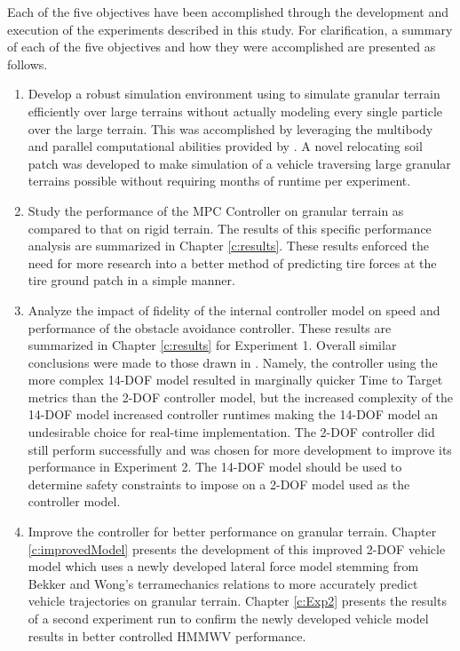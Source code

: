 \documentclass[12pt,onecolumn]{report}
\newcommand{\CHRONO}{{\sffamily{{Chrono}}}}
\begin{document}
Each of the five objectives have been accomplished through the development and execution of the experiments described in this study. For clarification, a summary of each of the five objectives and how they were accomplished are presented as follows.

\begin{enumerate}
\item
Develop a robust simulation environment using {\CHRONO} to simulate granular terrain efficiently over large terrains without actually modeling every single particle over the large terrain. This was accomplished by leveraging the multibody and parallel computational abilities provided by {\CHRONO}. A novel relocating soil patch was developed to make simulation of a vehicle traversing large granular terrains possible without requiring months of runtime per experiment. 
\item
Study the performance of the MPC Controller on granular terrain as compared to that on rigid terrain. The results of this specific performance analysis are summarized in Chapter \ref{c:results}. These results enforced the need for more research into a better method of predicting tire forces at the tire ground patch in a simple manner. 
\item
Analyze the impact of fidelity of the internal controller model on speed and performance of the obstacle avoidance controller. These results are summarized in Chapter \ref{c:results} for Experiment 1. Overall similar conclusions were made to those drawn in \cite{ModelFidelity2016}. Namely, the controller using the more complex 14-DOF model resulted in marginally quicker Time to Target metrics than the 2-DOF controller model, but the increased complexity of the 14-DOF model increased controller runtimes making the 14-DOF model an undesirable choice for real-time implementation. The 2-DOF controller did still perform successfully and was chosen for more development to  improve its performance in Experiment 2. The 14-DOF model should be used to determine safety constraints to impose on a 2-DOF model used as the controller model. 
\item
Improve the controller for better performance on granular terrain. Chapter \ref{c:improvedModel} presents the development of this improved 2-DOF vehicle model which uses a newly developed lateral force model stemming from Bekker and Wong's terramechanics relations to more accurately predict vehicle trajectories on granular terrain. Chapter \ref{c:Exp2} presents the results of a second experiment run to confirm the newly developed vehicle model results in better controlled HMMWV performance.  

\end{enumerate}
\end{document}
